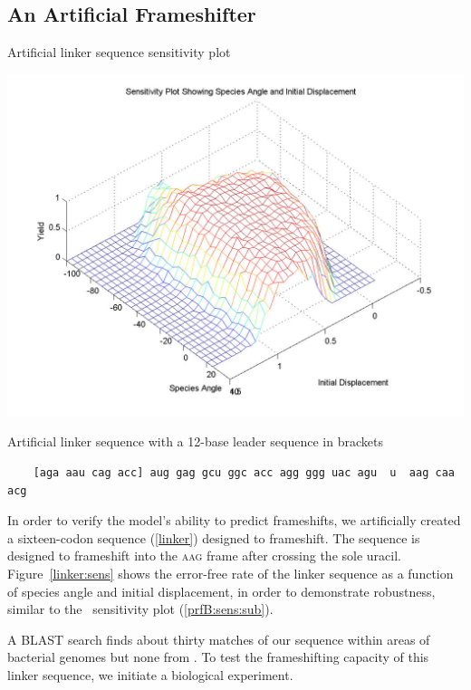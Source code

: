 \documentclass[12pt]{article}
\numberwithin{equation}{section}
\begin{document}
\subsection{An Artificial Frameshifter}
\begin{cfigure}
  \caption{Artificial linker sequence sensitivity plot}
  \label{linker:sens}
  \includegraphics[scale=0.25]{linker/sensitivity}
\end{cfigure}

\begin{cfigure}
  \caption{Artificial linker sequence with a 12-base leader sequence
    in brackets}
  \label{linker}
  \begin{verbatim}
    [aga aau cag acc] aug gag gcu ggc acc agg ggg uac agu  u  aag caa acg
  \end{verbatim}
\end{cfigure}

In order to verify the model's ability to predict frameshifts, we
artificially created a sixteen-codon sequence (\autoref{linker})
designed to frameshift.  The sequence is designed to frameshift into
the \textsc{aag} frame after crossing the sole uracil.  Figure~\ref{linker:sens}
shows the error-free rate of the linker sequence as a function of species
angle and initial displacement, in order to demonstrate robustness,
similar to the \prfB\ sensitivity plot (\autoref{prfB:sens:sub}).

A BLAST search finds about thirty matches of our sequence within areas of
bacterial genomes but none from \ecoli. To test the frameshifting capacity of
this linker sequence, we initiate a biological experiment.
\end{document}
